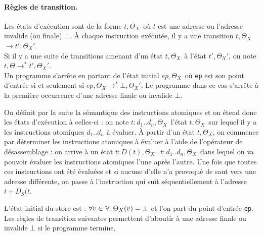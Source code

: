 \paragraph{Règles de transition.}
Les états d'exécution sont de la forme \textlangle$t, \Theta_X$\textrangle\ où $t$ est une adresse ou l'adresse invalide (ou finale) $\bot$. 
À chaque instruction exécutée, il y a une transition \textlangle$t, \Theta_X$\textrangle$\rightarrow$\textlangle$t', \Theta_X'$\textrangle.\\
Si il y a une suite de transitions amenant d'un état \textlangle$t, \Theta_X$\textrangle\ à l'état \textlangle$t', \Theta_X'$\textrangle, on note \textlangle$t, \Theta$\textrangle$\rightarrow^*$\textlangle$t', \Theta_X'$\textrangle.\\
Un programme s'arrête en partant de l'état initial \textlangle$ep, \Theta_X$\textrangle\ où \texttt{ep} est son point d'entrée si et seulement si \textlangle$ep, \Theta_X$\textrangle$\rightarrow^*$\textlangle$\bot, \Theta_X'$\textrangle. 
Le programme dans ce cas s'arrête à la première occurrence d'une adresse finale ou invalide $\bot$.

On définit par la suite la sémantique des instructions atomiques et on étend donc les états d'exécution à celles-ci : on note \textlangle$t:d_1..d_n, \Theta_X$\textrangle\ l'état \textlangle$t, \Theta_X$\textrangle\ sur lequel il y a les instructions atomiques $d_1..d_n$ à évaluer.
À partir d'un état \textlangle$t, \Theta_X$\textrangle, on commence par déterminer les instructions atomiques à évaluer à l'aide de l'opérateur de désassemblage : on arrive à un état \textlangle$t:D(t), \Theta_X$\textrangle=\textlangle$t:d_1..d_n, \Theta_X$\textrangle\ dans lequel on va pouvoir évaluer les instructions atomiques l'une après l'autre. 
Une fois que toutes ces instructions ont été évaluées et si aucune d'elle n'a provoqué de saut vers une adresse différente, on passe à l'instruction qui suit séquentiellement à l'adresse $t+D_S(t$\textrangle.

L'état initial du store est : $\forall v\in\mathbb V, \Theta_X(v)=\bot$ et l'on part du point d'entrée \texttt{ep}. Les règles de transition suivantes permettent d'aboutir à une adresse finale ou invalide $\bot$ si le programme termine.

